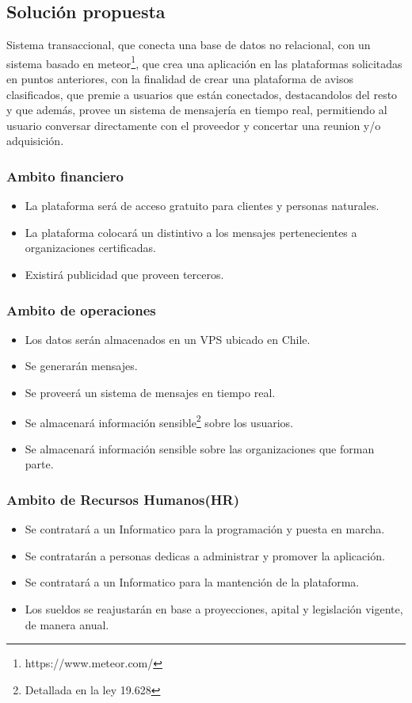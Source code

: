 \documentclass[letterpaper,openright,10pt,oneside]{report}
\begin{document}
			\subsection{Solución propuesta}
			
			Sistema transaccional, que conecta una base de datos no relacional, con un sistema basado en meteor\footnote{https://www.meteor.com/}, que crea una aplicación en las plataformas solicitadas en puntos anteriores, con la finalidad de crear una plataforma de avisos clasificados, que premie a usuarios que están conectados, destacandolos del resto y que además, provee un sistema de mensajería en tiempo real, permitiendo al usuario conversar directamente con el proveedor y concertar una reunion y/o adquisición.
				
					\subsubsection{Ambito financiero}
						\begin{itemize}
							\item La plataforma será de acceso gratuito para clientes y personas naturales.
							\item La plataforma colocará un distintivo a los mensajes pertenecientes a organizaciones certificadas.
							\item Existirá publicidad que proveen terceros.
						\end{itemize}
					\subsubsection{Ambito de operaciones}
						\begin{itemize}
							\item Los datos serán almacenados en un VPS ubicado en Chile.
							\item Se generarán mensajes.
							\item Se proveerá un sistema de mensajes en tiempo real.
							\item Se almacenará información sensible\footnote{Detallada en la ley 19.628} sobre los usuarios.
							\item Se almacenará información sensible sobre las organizaciones que forman parte. 
						\end{itemize}
					\subsubsection{Ambito de Recursos Humanos(HR)}
						\begin{itemize}
							\item Se contratará a un Informatico para la programación y puesta en marcha.
							\item Se contratarán a personas dedicas a administrar y promover la aplicación.
							\item Se contratará a un Informatico para la mantención de la plataforma.
							\item Los sueldos se reajustarán en base a proyecciones, apital y legislación vigente, de manera anual.
						\end{itemize}
\end{document}
